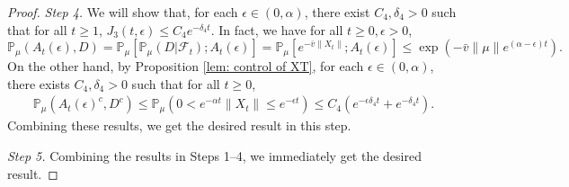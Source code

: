 \documentclass[EJP]{ejpecp} %
\begin{document}
\begin{proof}
\emph{Step 4.}
We will show that, for each $\epsilon\in (0,  \alpha)$, there exist $C_4,\delta_4>0$ such that for all $t\geq 1$, $J_3(t,\epsilon)\leq C_4e^{-\delta_4 t}.$
In fact, we have  for all $t\geq 0, \epsilon >0$,
\[
  \mathbb P_{\mu}(A_{t}(\epsilon), D)
  = \mathbb P_{\mu}[\mathbb P_{\mu}(D|\mathscr F_t);A_t(\epsilon)]
  = \mathbb P_\mu[e^{-\bar v\|X_t\|};A_t(\epsilon)]
  \leq \exp({-\bar v \|\mu\|e^{(\alpha - \epsilon)t}}).
\]
On the other hand, by Proposition \ref{lem: control of XT}, for each $\epsilon \in (0, \alpha)$, there exists  $C_{4}, \delta_{4}>0$ such that for all $t\geq 0$,
\begin{align}
  \mathbb P_\mu(A_t(\epsilon)^c,D^c)
  \leq \mathbb P_\mu(0 < e^{-\alpha t}\|X_t\|
  \leq e^{ - \epsilon t}) \leq C_{4} (e^{-\epsilon \delta_{4} t}+e^{-\delta_{4} t}).
\end{align}
 Combining these results, we get the desired result in this step.

 \emph{Step 5.} Combining the results in Steps 1--4, we immediately get the desired result.
\end{proof}
\end{document}
